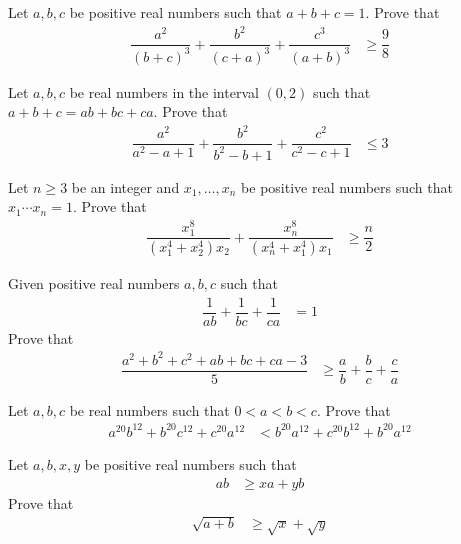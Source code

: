 \documentclass{subfile}
\begin{document}
		\begin{problem}[$2014$ Test $4$]
			Let $a,b,c$ be positive real numbers such that $a+b+c=1$. Prove that
				\begin{align*}
					\dfrac{a^{2}}{(b+c)^{3}}+\dfrac{b^{2}}{(c+a)^{3}}+\dfrac{c^{3}}{(a+b)^{3}}
						& \geq \dfrac{9}{8}
				\end{align*}
		\end{problem}
	
		\begin{problem}[$2014$ Test $6$]
			Let $a,b,c$ be real numbers in the interval $(0,2)$ such that $a+b+c=ab+bc+ca$. Prove that
				\begin{align*}
					\dfrac{a^{2}}{a^{2}-a+1}+\dfrac{b^{2}}{b^{2}-b+1}+\dfrac{c^{2}}{c^{2}-c+1}
						& \leq3
				\end{align*}
		\end{problem}
	
		\begin{problem}[$2013$ Test $3$]
			Let $n\geq3$ be an integer and $x_{1},\ldots,x_{n}$ be positive real numbers such that $x_{1}\cdots x_{n}=1$. Prove that
				\begin{align*}
					\dfrac{x_{1}^{8}}{(x_{1}^{4}+x_{2}^{4})x_{2}}+\dfrac{x_{n}^{8}}{(x_{n}^{4}+x_{1}^{4})x_{1}}
						& \geq\dfrac{n}{2}
				\end{align*}
		\end{problem}
	
		\begin{problem}[$2013$ Test $7$]
			Given positive real numbers $a,b,c$ such that
				\begin{align*}
					\dfrac{1}{ab}+\dfrac{1}{bc}+\dfrac{1}{ca}
						& = 1
				\end{align*}
			Prove that
				\begin{align*}
					\dfrac{a^{2}+b^{2}+c^{2}+ab+bc+ca-3}{5}
						& \geq \dfrac{a}{b}+\dfrac{b}{c}+\dfrac{c}{a}
				\end{align*}
		\end{problem}
	
		\begin{problem}[$2012$ Test $1$]
			Let $a,b,c$ be real numbers such that $0<a<b<c$. Prove that
				\begin{align*}
					a^{20}b^{12}+b^{20}c^{12}+c^{20}a^{12}
						& < b^{20}a^{12}+c^{20}b^{12}+b^{20}a^{12}
				\end{align*}
		\end{problem}
	
		\begin{problem}[$2011$ Round $3$]
			Let $a,b,x,y$ be positive real numbers such that
				\begin{align*}
					ab
						& \geq xa+yb
				\end{align*}
			Prove that
				\begin{align*}
					\sqrt{a+b}
						& \geq\sqrt{x}+\sqrt{y}
				\end{align*}
		\end{problem}
	
\end{document}
